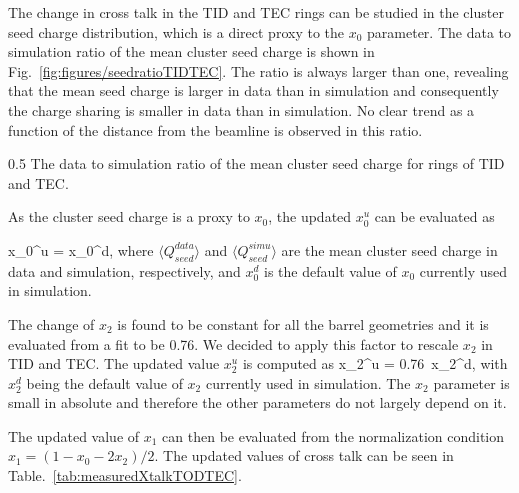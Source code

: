 The change in cross talk in the TID and TEC rings can be studied in the cluster seed charge distribution, which is a direct proxy to the $x_{0}$ parameter. The data to simulation ratio of the mean cluster seed charge is shown in Fig.~\ref{fig:figures/seedratioTIDTEC}. The ratio is always larger than one, revealing that the mean seed charge is larger in data than in simulation and consequently the charge sharing is smaller in data than in simulation. No clear trend as a function of the distance from the beamline is observed in this ratio.

                 {0.5}       %
                 {The data to simulation ratio of the mean cluster seed charge for rings of TID and TEC.}

As the cluster seed charge is a proxy to $x_{0}$, the updated $x_{0}^{u}$ can be evaluated as

{
x_{0}^{u} = x_{0}^{d},
}
where $\langle Q_{seed}^{data} \rangle$ and $\langle Q_{seed}^{simu} \rangle$ are the mean cluster seed charge in data and simulation, respectively, and $x_{0}^{d}$ is the default value of $x_{0}$ currently used in simulation. 

The change of $x_{2}$ is found to be constant for all the barrel geometries and it is evaluated from a fit to be 0.76. We decided to apply this factor to rescale $x_{2}$ in TID and TEC. The updated value $x_{2}^{u}$ is computed as 
{
x_{2}^{u} = 0.76~x_{2}^{d},
}
with  $x_{2}^{d}$ being the default value of $x_{2}$ currently used in simulation. The $x_{2}$ parameter is small in absolute and therefore the other parameters do not largely depend on it. 

The updated value of $x_{1}$ can then be evaluated from the normalization condition $x_{1} = (1-x_{0}-2x_{2})/2$. The updated values of cross talk can be seen in Table.~\ref{tab:measuredXtalkTODTEC}.

